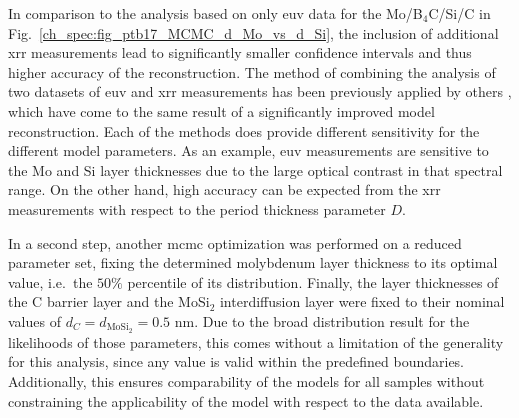 In comparison to the analysis based on only \gls{euv} data for the Mo/B$_4$C/Si/C in Fig.~\ref{ch_spec:fig_ptb17_MCMC_d_Mo_vs_d_Si}, the inclusion of additional \gls{xrr} measurements lead to significantly smaller confidence intervals and thus higher accuracy of the reconstruction. The method of combining the analysis of two datasets of \gls{euv} and \gls{xrr} measurements has been previously applied by others \cite{yakunin_combined_2014}, which have come to the same result of a significantly improved model reconstruction. Each of the methods does provide different sensitivity for the different model parameters. As an example, \gls{euv} measurements are sensitive to the Mo and Si layer thicknesses due to the large optical contrast in that spectral range. On the other hand, high accuracy can be expected from the \gls{xrr} measurements with respect to the period thickness parameter $D$.

In a second step, another \gls{mcmc} optimization was performed on a reduced parameter set, fixing the determined molybdenum layer thickness to its optimal value, i.e.~the $50\%$ percentile of its distribution. Finally, the layer thicknesses of the C barrier layer and the MoSi$_2$ interdiffusion layer were fixed to their nominal values of $d_C = d_{\text{MoSi}_2} = 0.5 $ nm. Due to the broad distribution result for the likelihoods of those parameters, this comes without a limitation of the generality for this analysis, since any value is valid within the predefined boundaries. Additionally, this ensures comparability of the models for all samples without constraining the applicability of the model with respect to the data available.

